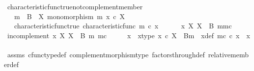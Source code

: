 \begin{isabellebody}
\ characteristic{\isacharunderscore}{\kern0pt}func{\isacharunderscore}{\kern0pt}true{\isacharunderscore}{\kern0pt}not{\isacharunderscore}{\kern0pt}complement{\isacharunderscore}{\kern0pt}member{\isacharcolon}{\kern0pt}\isanewline
\ \ \ {\isachardoublequoteopen}m\ {\isacharcolon}{\kern0pt}\ B\ {\isasymrightarrow}\ X{\isachardoublequoteclose}\ {\isachardoublequoteopen}monomorphism\ m{\isachardoublequoteclose}\ {\isachardoublequoteopen}x\ {\isasymin}\isactrlsub c\ X{\isachardoublequoteclose}\isanewline
\ \ \ characteristic{\isacharunderscore}{\kern0pt}func{\isacharunderscore}{\kern0pt}true{\isacharcolon}{\kern0pt}\ {\isachardoublequoteopen}characteristic{\isacharunderscore}{\kern0pt}func\ m\ {\isasymcirc}\isactrlsub c\ x\ {\isacharequal}{\kern0pt}\ {\isasymt}{\isachardoublequoteclose}\isanewline
\ \ \ {\isachardoublequoteopen}{\isasymnot}\ x\ {\isasymin}\isactrlbsub X\isactrlesub \ {\isacharparenleft}{\kern0pt}X\ {\isasymsetminus}\ {\isacharparenleft}{\kern0pt}B{\isacharcomma}{\kern0pt}\ m{\isacharparenright}{\kern0pt}{\isacharcomma}{\kern0pt}m\isactrlsup c{\isacharparenright}{\kern0pt}{\isachardoublequoteclose}\isanewline
%
\isadelimproof
%
\endisadelimproof
%
\isatagproof
{}\isamarkupfalse%
\isanewline
\ \ \isamarkupfalse%
\ in{\isacharunderscore}{\kern0pt}complement{\isacharcolon}{\kern0pt}\ {\isachardoublequoteopen}x\ {\isasymin}\isactrlbsub X\isactrlesub \ {\isacharparenleft}{\kern0pt}X\ {\isasymsetminus}\ {\isacharparenleft}{\kern0pt}B{\isacharcomma}{\kern0pt}\ m{\isacharparenright}{\kern0pt}{\isacharcomma}{\kern0pt}\ m\isactrlsup c{\isacharparenright}{\kern0pt}{\isachardoublequoteclose}\isanewline
\ \ \isamarkupfalse%
\ \isamarkupfalse%
\ x{\isacharprime}{\kern0pt}\ \ x{\isacharprime}{\kern0pt}{\isacharunderscore}{\kern0pt}type{\isacharcolon}{\kern0pt}\ {\isachardoublequoteopen}x{\isacharprime}{\kern0pt}\ {\isasymin}\isactrlsub c\ X\ {\isasymsetminus}\ {\isacharparenleft}{\kern0pt}B{\isacharcomma}{\kern0pt}m{\isacharparenright}{\kern0pt}{\isachardoublequoteclose}\ \ x{\isacharprime}{\kern0pt}{\isacharunderscore}{\kern0pt}def{\isacharcolon}{\kern0pt}\ {\isachardoublequoteopen}m\isactrlsup c\ {\isasymcirc}\isactrlsub c\ x{\isacharprime}{\kern0pt}\ {\isacharequal}{\kern0pt}\ x{\isachardoublequoteclose}\isanewline
\ \ \ \ \isamarkupfalse%
\ assms\ cfunc{\isacharunderscore}{\kern0pt}type{\isacharunderscore}{\kern0pt}def\ complement{\isacharunderscore}{\kern0pt}morphism{\isacharunderscore}{\kern0pt}type\ factors{\isacharunderscore}{\kern0pt}through{\isacharunderscore}{\kern0pt}def\ relative{\isacharunderscore}{\kern0pt}member{\isacharunderscore}{\kern0pt}def{}\isanewline

\end{isabellebody}
